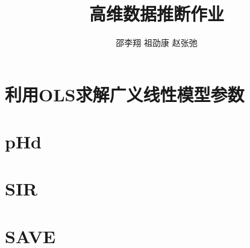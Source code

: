\documentclass[cn,11pt]{elegantpaper}
\title{高维数据推断作业}
\author{邵李翔 \quad 祖劭康 \quad 赵张弛}
\date{}
\begin{document}
    


\maketitle
\newpage
\tableofcontents

\newpage
\section{利用OLS求解广义线性模型参数}



\section{pHd}

\section{SIR}

\section{SAVE}
\end{document}
